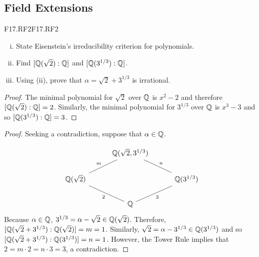 \documentclass[../AlgebraQualSolutions.tex]{subfiles}
\begin{document}
\subsection{Field Extensions}

\begin{prob}{F17.RF2}{F17.RF2}
	\begin{enumerate}[(i)]
		\item State Eisenstein's irreducibility criterion for polynomials.
		\item Find $[\mathbb{Q}(\sqrt 2): \mathbb{Q}]$ and $[\mathbb{Q}(3^{1/3}): \mathbb{Q}]$.
		\item Using (ii), prove that $\alpha = \sqrt{2}+3^{1/3}$ is irrational.
	\end{enumerate}
\end{prob}

\begin{proof}
	The minimal polynomial for $\sqrt2$ over $\mathbb{Q}$ is $x^2 - 2$ and therefore $[\mathbb{Q}(\sqrt 2): \mathbb{Q}] =2$. Similarly, the minimal polynomial for $3^{1/3}$ over $\mathbb{Q}$ is $x^3 - 3$ and so $[\mathbb{Q}(3^{1/3}): \mathbb{Q}] = 3$.
\end{proof}

\begin{proof}
	Seeking a contradiction, suppose that $\alpha \in \mathbb{Q}$.

	\[
		\begin{tikzcd}[column sep=1cm]
		  & \Q(\sqrt2,3^{1/3}) & \\
		  \Q(\sqrt2) \ar[ru, no head,"m"]& & \ar[lu, no head,"n"'] \Q(3^{1/3}) \\
		  & \Q \ar[lu, no head, "2"] \ar[ru, no head, "3"']&
		\end{tikzcd}
		\]
	Because $\alpha \in \mathbb{Q}$, $3^{1/3} = \alpha - \sqrt2 \in \mathbb{Q}(\sqrt2)$. Therefore, $[\mathbb{Q}(\sqrt2 + 3^{1/3}): \mathbb{Q}(\sqrt2)] = m = 1$. Similarly, $\sqrt{2} = \alpha - 3^{1/3} \in \mathbb{Q}(3^{1/3})$ and so $[\mathbb{Q}(\sqrt2 + 3^{1/3}): \mathbb{Q}(3^{1/3})] = n = 1$. However, the Tower Rule implies that $2 = m\cdot2 = n\cdot 3 = 3$, a contradiction. 
\end{proof}
\end{document}
